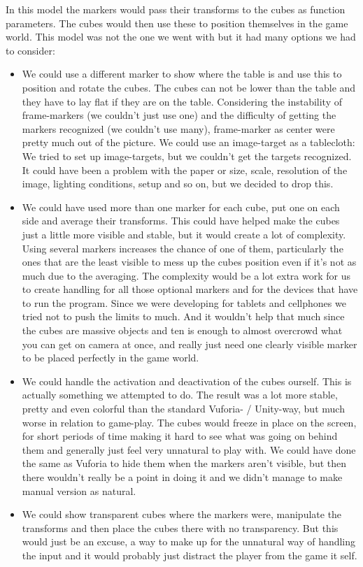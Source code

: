 In this model the markers would pass their transforms to the cubes as function parameters. 
The cubes would then use these to position themselves in the game world. 
This model was not the one we went with but it had many options we had to consider:
\begin{itemize}
  \item We could use a different marker to show where the table is and use this to position and rotate the cubes. 
  The cubes can not be lower than the table and they have to lay flat if they are on the table. 
  Considering the instability of frame-markers (we couldn't just use one) and the difficulty of getting the markers recognized (we couldn't use many), frame-marker as center were pretty much out of the picture. 
  We could use an image-target as a tablecloth: 
  We tried to set up image-targets, but we couldn't get the targets recognized. 
  It could have been a problem with the paper or size, scale, resolution of the image, lighting conditions, setup and so on, but we decided to drop this.
  \item We could have used more than one marker for each cube, put one on each side and average their transforms. 
  This could have helped make the cubes just a little more visible and stable, but it would create a lot of complexity. 
  Using several markers increases the chance of one of them, particularly the ones that are the least visible to mess up the cubes position even if it's not as much due to the averaging. 
  The complexity would be a lot extra work for us to create handling for all those optional markers and for the devices that have to run the program. 
  Since we were developing for tablets and cellphones we tried not to push the limits to much. 
  And it wouldn't help that much since the cubes are massive objects and ten is enough to almost overcrowd what you can get on camera at once, and really just need one clearly visible marker to be placed perfectly in the game world.
  \item We could handle the activation and deactivation of the cubes ourself. 
  This is actually something we attempted to do. 
  The result was a lot more stable, pretty and even colorful than the standard Vuforia- / Unity-way, but much worse in relation to game-play. 
  The cubes would freeze in place on the screen, for short periods of time making it hard to see what was going on behind them and generally just feel very unnatural to play with. 
  We could have done the same as Vuforia to hide them when the markers aren't visible, but then there wouldn't really be a point in doing it and we didn't manage to make manual version as natural. 
  \item We could show transparent cubes where the markers were, manipulate the transforms and then place the cubes there with no transparency. 
  But this would just be an excuse, a way to make up for the unnatural way of handling the input and it would probably just distract the player from the game it self.
\end{itemize}


